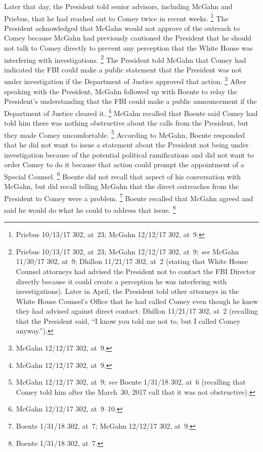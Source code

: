 Later that day, the President told senior advisors, including McGahn and Priebus, that he had reached out to Comey twice in recent weeks.%
\footnote{Priebus 10/13/17 302, at~23;
McGahn 12/12/17 302, at~9.}
The President acknowledged that McGahn would not approve of the outreach to Comey because McGahn had previously cautioned the President that he should not talk to Comey directly to prevent any perception that the White House was interfering with investigations.%
\footnote{Priebus 10/13/17 302, at~23;
McGahn 12/12/17 302, at~9;
\textit{see} McGahn 11/30/17 302, at~9;
Dhillon 11/21/17 302, at~2 (stating that White House Counsel attorneys had advised the President not to contact the FBI Director directly because it could create a perception he was interfering with investigations).
Later in April, the President told other attorneys in the White House Counsel's Office that he had called Comey even though he knew they had advised against direct contact.
Dhillon 11/21/17 302, at~2 (recalling that the President said, ``I know you told me not to, but I called Comey anyway.'').}
The President told McGahn that Comey had indicated the FBI could make a public statement that the President was not under investigation if the Department of Justice approved that action.%
\footnote{McGahn 12/12/17 302, at~9.}
After speaking with the President, McGahn followed up with Boente to relay the President's understanding that the FBI could make a public announcement if the Department of Justice cleared it.%
\footnote{McGahn 12/12/17 302, at~9.}
McGahn recalled that Boente said Comey had told him there was nothing obstructive about the calls from the President, but they made Comey uncomfortable.%
\footnote{McGahn 12/12/17 302, at~9;
\textit{see} Boente 1/31/18 302, at~6 (recalling that Comey told him after the March~30, 2017 call that it was not obstructive).}
According to McGahn, Boente responded that he did not want to issue a statement about the President not being under investigation because of the potential political ramifications and did not want to order Comey to do it because that action could prompt the appointment of a Special Counsel.%
\footnote{McGahn 12/12/17 302, at~9--10.}
Boente did not recall that aspect of his conversation with McGahn, but did recall telling McGahn that the direct outreaches from the President to Comey were a problem.%
\footnote{Boente 1/31/18 302, at~7;
McGahn 12/12/17 302, at~9.}
Boente recalled that McGahn agreed and said he would do what he could to address that issue.%
\footnote{Boente 1/31/18 302, at~7.}

